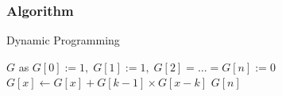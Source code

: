 \subsubsection{Algorithm}
\setcounter{algorithm}{0}
\begin{algorithm}[H]
\caption{Dynamic Programming}
\begin{algorithmic}[1]
\State $G$ as $G[0]:=1,\;G[1]:= 1,\; G[2]=\ldots=G[n]:=0$
\State $G[x] \gets G[x] + G[k-1]\times G[x-k]$
\EndFor
\EndFor
\State \Return $G[n]$
\EndProcedure
\end{algorithmic}
\end{algorithm}
